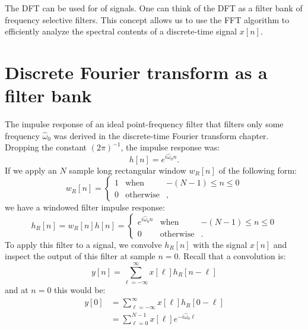 The DFT can be used for  of signals. One can think of
the DFT as a filter bank of frequency selective filters. This concept
allows us to use the FFT algorithm to efficiently analyze the spectral
contents of a discrete-time signal $x[n]$.

\section{Discrete Fourier transform as a filter bank}

The impulse response of an ideal point-frequency filter that filters
only some frequency $\hat{\omega}_0$ was derived in the discrete-time
Fourier transform chapter. Dropping the constant $(2\pi)^{-1}$, the impulse response was:
\begin{equation}
    h[n] = e^{i \hat{\omega}_0 n}.
\end{equation}
If we apply an $N$ sample long rectangular window $w_{R}[n]$ of the following form:
\begin{equation}
    w_R[n] =\left\{ \begin{array}{ccc}
        1 & \mathrm{when}      & -(N-1) \le n \le 0 \\
        0 & \mathrm{otherwise} & ,
    \end{array}
    \right.
\end{equation}
we have a windowed filter impulse response:
\begin{equation}
    h_R[n]=w_R[n]h[n] = \left\{ \begin{array}{ccc}
        e^{i \hat{\omega}_0 n} & \mathrm{when}      & -(N-1) \le n \le 0 \\
        0                      & \mathrm{otherwise} & .
    \end{array}
    \right.
\end{equation}
To apply this filter to a signal, we convolve $h_R[n]$ with the signal $x[n]$ and inspect
the output of this filter at sample $n=0$. Recall that a convolution is:
\begin{equation}
    y[n] = \sum_{\ell=-\infty}^{\infty} x[\ell]h_R[n-\ell]
\end{equation}
and at $n=0$ this would be:
\begin{align}
    y[0] & = \sum_{\ell=-\infty}^{\infty} x[\ell]h_R[0-\ell]       \\
         & = \sum_{\ell=0}^{N-1} x[\ell]e^{-i \hat{\omega}_0 \ell}
\end{align}
